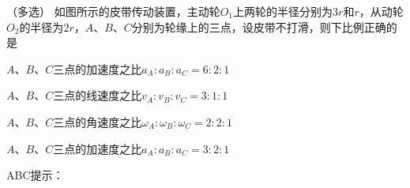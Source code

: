 （多选）
如图所示的皮带传动装置，主动轮\(O_1\)上两轮的半径分别为\(3r\)和\(r\)，从动轮\(O_2\)的半径为\(2r\)，\(A\)、\(B\)、\(C\)分别为轮缘上的三点，设皮带不打滑，则下比例正确的是\paren[]

\begin{choices}
	\item \(A\)、\(B\)、\(C\)三点的加速度之比\( a_A:a_B:a_C =6:2:1\)
	\item \(A\)、\(B\)、\(C\)三点的线速度之比\(v_A:v_B:v_C = 3:1:1\)
	\item \(A\)、\(B\)、\(C\)三点的角速度之比\(\omega_A:\omega_B:\omega_C = 2:2:1\)
	\item \(A\)、\(B\)、\(C\)三点的加速度之比\(a_A:a_B:a_C = 3:2:1\)
\end{choices}
\begin{answer}
	ABC\qquad 提示：
\end{answer}